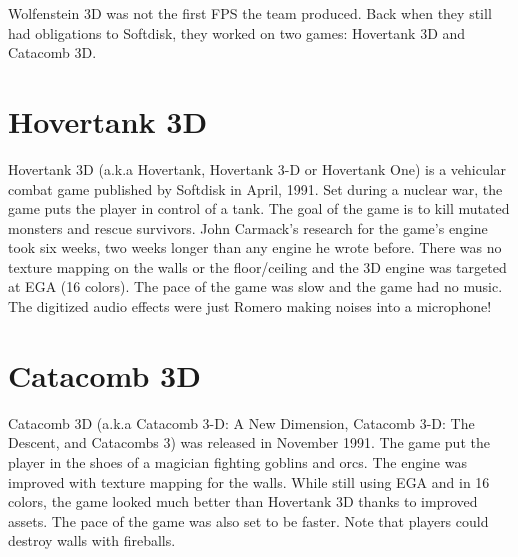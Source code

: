 Wolfenstein 3D was not the first FPS the team produced. Back when they still had obligations to Softdisk, they worked on two games: Hovertank 3D and Catacomb 3D.\\
\par
\section{Hovertank 3D}
Hovertank 3D (a.k.a Hovertank, Hovertank 3-D or Hovertank One) is a vehicular combat game published by Softdisk in April, 1991. Set during a nuclear war, the game puts the player in control of a tank. The goal of the game is to kill mutated monsters and rescue survivors. John Carmack's research for the game's engine took six weeks, two weeks longer than any engine he wrote before. There was no texture mapping on the walls or the floor/ceiling and the 3D engine was targeted at EGA (16 colors). The pace of the game was slow and the game had no music. The digitized audio effects were just Romero making noises into a microphone! \\
\par

\section{Catacomb 3D}
Catacomb 3D (a.k.a Catacomb 3-D: A New Dimension, Catacomb 3-D: The Descent, and Catacombs 3) was released in November 1991. The game put the player in the shoes of a magician fighting goblins and orcs. The engine was improved with texture mapping for the walls. While still using EGA and in 16 colors, the game looked much better than Hovertank 3D thanks to improved assets. The pace of the game was also set to be faster. Note that players could destroy walls with fireballs.\\
\par


\begin{minipage}{\textwidth}

\begin{figure}[H]
\centering
{}
\end{figure}

\begin{figure}[H]
\centering
{}
\end{figure}
\end{minipage}


\begin{minipage}{\textwidth}

\begin{figure}[H]
\centering
{}
\end{figure}

\begin{figure}[H]
\centering
{}
\end{figure}
\end{minipage}

